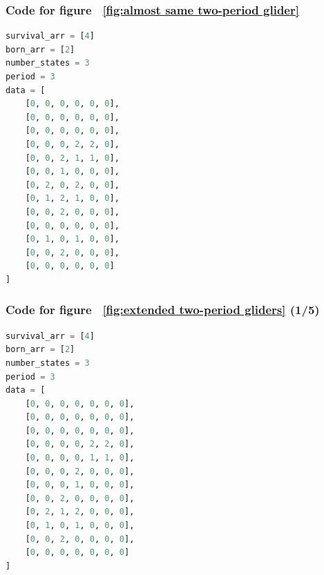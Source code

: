 \documentclass[12pt]{article}
\numberwithin{figure}{section} %
\begin{document}
\noindent\begin{minipage}{.45\textwidth}
\subsubsection{Code for figure ~\ref{fig:almost same two-period glider}}
\label{subsubsection:almost same two-period glider}
\begin{lstlisting}[language = Python]
survival_arr = [4]
born_arr = [2]
number_states = 3
period = 3
data = [
    [0, 0, 0, 0, 0, 0],
    [0, 0, 0, 0, 0, 0],
    [0, 0, 0, 0, 0, 0],
    [0, 0, 0, 2, 2, 0],
    [0, 0, 2, 1, 1, 0],
    [0, 0, 1, 0, 0, 0],
    [0, 2, 0, 2, 0, 0],
    [0, 1, 2, 1, 0, 0],
    [0, 0, 2, 0, 0, 0],
    [0, 0, 0, 0, 0, 0],
    [0, 1, 0, 1, 0, 0],
    [0, 0, 2, 0, 0, 0],
    [0, 0, 0, 0, 0, 0]
]
\end{lstlisting}
\end{minipage}\hfill
\begin{minipage}{.45\textwidth}
\subsubsection{Code for figure ~\ref{fig:extended two-period gliders} (1/5)}
\label{subsubsection:extended two-period gliders(1/5)}
\begin{lstlisting}[language = Python]
survival_arr = [4]
born_arr = [2]
number_states = 3
period = 3
data = [
    [0, 0, 0, 0, 0, 0, 0],
    [0, 0, 0, 0, 0, 0, 0],
    [0, 0, 0, 0, 0, 0, 0],
    [0, 0, 0, 0, 2, 2, 0],
    [0, 0, 0, 0, 1, 1, 0],
    [0, 0, 0, 2, 0, 0, 0],
    [0, 0, 0, 1, 0, 0, 0],
    [0, 0, 2, 0, 0, 0, 0],
    [0, 2, 1, 2, 0, 0, 0],
    [0, 1, 0, 1, 0, 0, 0],
    [0, 0, 2, 0, 0, 0, 0],
    [0, 0, 0, 0, 0, 0, 0]
]

\end{lstlisting}
\end{minipage}
\end{document}
